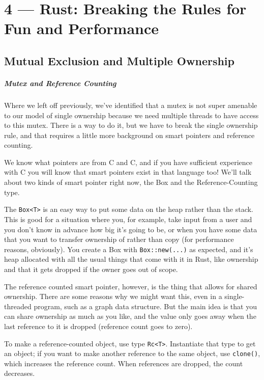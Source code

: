\documentclass[a4paper]{report}
\newcommand{\CPP}{C\nolinebreak\hspace{-.05em}\raisebox{.4ex}{\tiny\bf +}\nolinebreak\hspace{-.10em}\raisebox{.4ex}{\tiny\bf +}}
\def\CPP{{C\nolinebreak[4]\hspace{-.05em}\raisebox{.4ex}{\tiny\bf ++}}}
\begin{document}
\chapter*{4 --- Rust: Breaking the Rules for Fun and Performance}


\section*{Mutual Exclusion and Multiple Ownership}

\paragraph{Mutex and Reference Counting}

Where we left off previously, we've identified that a mutex is not super amenable to our model of single ownership because we need multiple threads to have access to this mutex. There is a way to do it, but we have to break the single ownership rule, and that requires a little more background on smart pointers and reference counting.

We know what pointers are from C and \CPP, and if you have sufficient experience with \CPP{ }you will know that smart pointers exist in that language too! We'll talk about two kinds of smart pointer right now, the Box and the Reference-Counting type.

The \texttt{Box<T>} is an easy way to put some data on the heap rather than the stack. This is good for a situation where you, for example, take input from a user and you don't know in advance how big it's going to be, or when you have some data that you want to transfer ownership of rather than copy (for performance reasons, obviously). You create a Box with \texttt{Box::new(...)} as expected, and it's heap allocated with all the usual things that come with it in Rust, like ownership and that it gets dropped if the owner goes out of scope.

The reference counted smart pointer, however, is the thing that allows for shared ownership. There are some reasons why we might want this, even in a single-threaded program, such as a graph data structure. But the main idea is that you can share ownership as much as you like, and the value only goes away when the last reference to it is dropped (reference count goes to zero). 

To make a reference-counted object, use type \texttt{Rc<T>}. Instantiate that type to get an object; if you want to make another reference to the same object, use \texttt{clone()}, which increases the reference count. When references are dropped, the count decreases.
\end{document}
